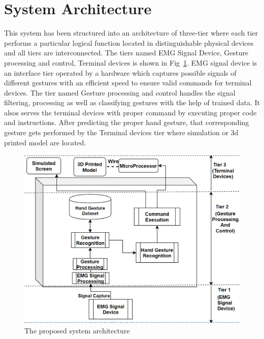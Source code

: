 \documentclass[conference]{IEEEtran}
\begin{document}
\section{System Architecture}
This system has been structured into an architecture of three-tier where each tier performs a particular logical function located in distinguishable physical devices and all tiers are interconnected. The tiers named EMG Signal Device, Gesture processing and control, Terminal devices is shown in Fig~\ref{fig:flow chart}. EMG signal device is an interface tier operated by a hardware which captures possible signals of different gestures with an efficient speed to ensure valid commands for terminal devices. The tier named Gesture processing and control handles the signal filtering, processing as well as classifying gestures with the help of trained data. It alsos serves the terminal devices with proper command by executing proper code and instructions. After predicting the proper hand gesture, that corresponding gesture gets performed by the Terminal devices tier where simulation or 3d printed model are located. 
\begin{figure}[htbp]
 \centerline{ \includegraphics[scale=0.4]{Capture1 (5).PNG}}
  \caption{The proposed system architecture}
  \label{fig:flow chart}
\end{figure}
\end{document}
